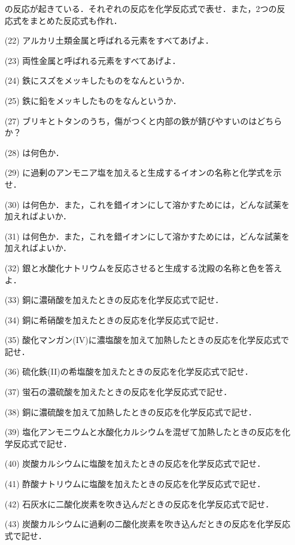 \documentclass[a4paper,twocolumn,11pt]{ltjsarticle}
\begin{document}
\begin{itemize}
    の反応が起きている．それぞれの反応を化学反応式で表せ．また，2つの反応式をまとめた反応式も作れ．\newpage
\item[(22)]アルカリ土類金属と呼ばれる元素をすべてあげよ．\\[2cm]
\item[(23)]両性金属と呼ばれる元素をすべてあげよ．\\[2cm]
\item[(24)]鉄にスズをメッキしたものをなんというか．\\[2cm]
\item[(25)]鉄に鉛をメッキしたものをなんというか．\\  [2cm]
\item[(27)]ブリキとトタンのうち，傷がつくと内部の鉄が錆びやすいのはどちらか？\\[2cm]
\item[(28)]は何色か．\newpage
\item[(29)]  に過剰のアンモニア塩を加えると生成するイオンの名称と化学式を示せ．\\[3cm]
\item[(30)]は何色か．また，これを錯イオンにして溶かすためには，どんな試薬を加えればよいか．\\[2cm]
\item[(31)]は何色か．また，これを錯イオンにして溶かすためには，どんな試薬を加えればよいか．\\[2cm]
\item[(32)]銀と水酸化ナトリウムを反応させると生成する沈殿の名称と色を答えよ．\\[2cm]
\item[(33)]銅に濃硝酸を加えたときの反応を化学反応式で記せ．\\[2cm]
\newpage 
\item[(34)]銅に希硝酸を加えたときの反応を化学反応式で記せ．\\[2cm]
\item[(35)]酸化マンガン(IV)に濃塩酸を加えて加熱したときの反応を化学反応式で記せ．\\[2cm]
\item[(36)]硫化鉄(II)の希塩酸を加えたときの反応を化学反応式で記せ．\\[2cm]
\item[(37)]蛍石の濃硫酸を加えたときの反応を化学反応式で記せ．\\[2cm]
\item[(38)]銅に濃硫酸を加えて加熱したときの反応を化学反応式で記せ．\\[2cm]
\newpage
\item[(39)] 塩化アンモニウムと水酸化カルシウムを混ぜて加熱したときの反応を化学反応式で記せ．\\[2cm]
\item[(40)]炭酸カルシウムに塩酸を加えたときの反応を化学反応式で記せ．\\[2cm]
\item[(41)]酢酸ナトリウムに塩酸を加えたときの反応を化学反応式で記せ．\\[2cm]       
 \item[(42)]石灰水に二酸化炭素を吹き込んだときの反応を化学反応式で記せ．\\[2cm]
 \item[(43)]炭酸カルシウムに過剰の二酸化炭素を吹き込んだときの反応を化学反応式で記せ．      
    \end{itemize}
\end{document}
